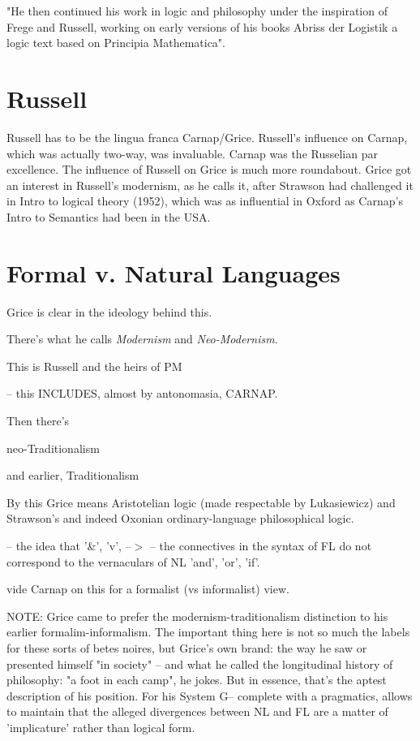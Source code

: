 \documentclass[10pt,titlepage]{book}
\begin{document}
{"He then continued his work in logic and philosophy under  the inspiration 
of Frege and Russell, working on early versions of his books  Abriss der 
Logistik a logic text based on Principia Mathematica".
 
\section{Russell}
 
Russell has to be the lingua franca Carnap/Grice. Russell's influence on  
Carnap, which was actually two-way, was invaluable. Carnap was the Russelian 
par  excellence. The influence of Russell on Grice is much more roundabout. 
Grice got  an interest in Russell's modernism, as he calls it, after 
Strawson had  challenged it in Intro to logical theory (1952), which was as 
influential in  Oxford as Carnap's Intro to Semantics had been in the USA.
 
\section{Formal v. Natural Languages}
 
Grice is clear in the ideology behind this.
 
There's what he calls {\it Modernism} and {\it Neo-Modernism}.
 
This is Russell and the heirs of PM
 
  -- this INCLUDES, almost by antonomasia, CARNAP.
 
 
Then there's
 
  neo-Traditionalism
 
  and earlier, Traditionalism
 
  By this Grice means Aristotelian logic (made respectable by  Lukasiewicz)
  and Strawson's and indeed Oxonian ordinary-language philosophical  logic.
 
  -- the idea that '\&', 'v', --$>$ -- the connectives in the  syntax of FL
  do not correspond to the vernaculars of NL 'and', 'or', 'if'.
 
  vide Carnap on this for a formalist (vs informalist) view.
  

NOTE: Grice came to prefer the modernism-traditionalism  distinction to his 
earlier formalim-informalism. The important thing here is not  so much the 
labels for these sorts of betes noires, but Grice's own brand: the  way he 
saw or presented himself "in society" -- and what he called the  longitudinal 
history of philosophy: "a foot in each camp", he jokes. But in  essence, 
that's the aptest description of his position. For his System G--  complete 
with a pragmatics, allows to maintain that the alleged divergences  between 
NL and FL are a matter of 'implicature' rather than logical form. 
 
}
\end{document}
